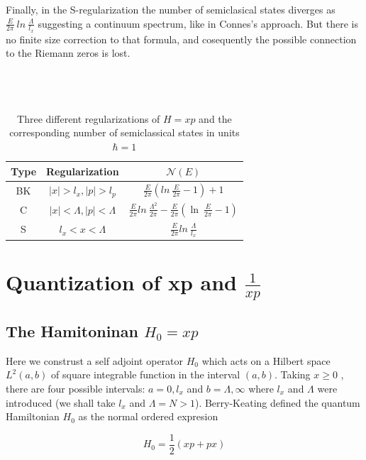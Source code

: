 \documentclass[12pt]{report}
\newcommand*{\1}{\hspace{1pt}}
\begin{document}
    Finally, in the S-regularization the number of semiclasical states diverges as $\frac{E}{2\pi} \ ln \ \frac{\Lambda}{l_{x}}$ suggesting a continuum spectrum, like in 
    Connes's approach. But there is no finite size correction to that formula, and cosequently the possible connection to the Riemann zeros is lost. \\ 
    \\ 
    \\


    \begin{longtable}[c]{c c c }
        \caption{\\Three different regularizations of $H=xp$ and the corresponding number of semiclassical states in units $\hbar=1$\cite{s7} }\\
        \hline
         Type & Regularization & $\mathcal{N}(E)$\\
         \hline 
         BK & $|x| > l_{x}, |p| > l_{p}$ & $\frac{E}{2\pi}\left(ln \ \frac{E}{2\pi}-1\right)+1$  \\  
         C & $|x| < \Lambda, |p| < \Lambda$ & $\frac{E}{2\pi}ln \ \frac{\Lambda^{2}}{2\pi} - \frac{E}{2\pi}\left(\ln \ \frac{E}{2\pi}-1\right)$   \\ 
         S & $l_{x} < x < \Lambda$ & $\frac{E}{2\pi}ln \ \frac{\Lambda}{l_{x}}$   \\ 
        \hline
    \end{longtable}

    \newpage
    \chapter{Quantization of xp and $\frac{1}{xp}$}
    
    
    \section{The Hamitoninan $H_{0} = xp$}

        Here we construst a self adjoint operator $H_{0}$ which acts on a Hilbert space $L^{2}(a,b)$ of square integrable function in the interval $(a,b)$. Taking $x\geqslant 0$
        , there are four possible intervals: $a=0,l_{x}$ and $b=\Lambda, \infty $ where $l_{x}$ and $\Lambda$ were introduced (we shall take $l_{x}$ and $\Lambda = N > 1$).
        Berry-Keating defined the quantum Hamiltonian $H_{0}$ as the normal ordered expresion 

        \begin{equation}
            H_{0} = \frac{1}{2}(xp + px)
        \end{equation}
\end{document}
